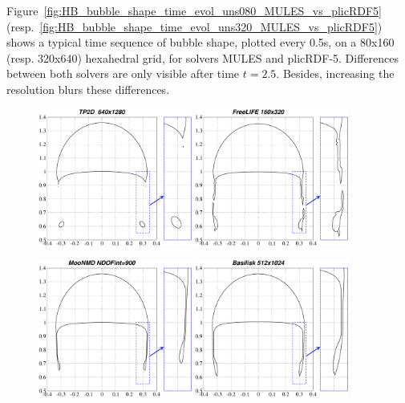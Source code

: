 \documentclass[review]{elsarticle}
\begin{document}
Figure~\ref{fig:HB_bubble_shape_time_evol_uns080_MULES_vs_plicRDF5} (resp.~\ref{fig:HB_bubble_shape_time_evol_uns320_MULES_vs_plicRDF5}) shows a typical time sequence of bubble shape, plotted every 0.5s, on a 80x160 (resp. 320x640) hexahedral grid, for solvers MULES and plicRDF-5. Differences between both solvers are only visible after time $t=2.5$. Besides, increasing the resolution blurs these differences. 

\begin{figure}[!h]
\begin{center}
 \includegraphics[width=0.45\textwidth]{figures/bubble_shape_t=3_TP2D.pdf}
 \hspace{4mm}
 \includegraphics[width=0.45\textwidth]{figures/bubble_shape_t=3_FreeLIFE.pdf}

 \vspace{2mm}

 \includegraphics[width=0.45\textwidth]{figures/bubble_shape_t=3_MoonNMD.pdf}
 \hspace{4mm}
 \includegraphics[width=0.45\textwidth]{figures/bubble_shape_t=3_Basilisk.pdf}
 

\end{center}
\end{figure}
\end{document}
